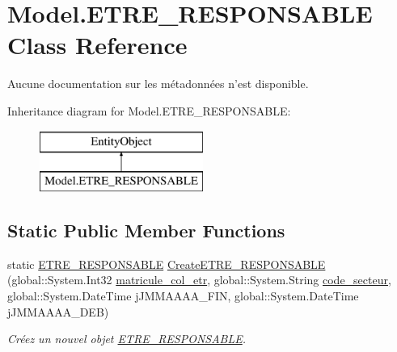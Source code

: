 \hypertarget{class_model_1_1_e_t_r_e___r_e_s_p_o_n_s_a_b_l_e}{\section{Model.\-E\-T\-R\-E\-\_\-\-R\-E\-S\-P\-O\-N\-S\-A\-B\-L\-E Class Reference}
\label{class_model_1_1_e_t_r_e___r_e_s_p_o_n_s_a_b_l_e}
}


Aucune documentation sur les métadonnées n'est disponible.  


Inheritance diagram for Model.\-E\-T\-R\-E\-\_\-\-R\-E\-S\-P\-O\-N\-S\-A\-B\-L\-E\-:\begin{figure}[H]
\begin{center}
\leavevmode
\includegraphics[height=2.000000cm]{class_model_1_1_e_t_r_e___r_e_s_p_o_n_s_a_b_l_e}
\end{center}
\end{figure}
\subsection*{Static Public Member Functions}
\begin{DoxyCompactItemize}
\item 
static \hyperlink{class_model_1_1_e_t_r_e___r_e_s_p_o_n_s_a_b_l_e}{E\-T\-R\-E\-\_\-\-R\-E\-S\-P\-O\-N\-S\-A\-B\-L\-E} \hyperlink{class_model_1_1_e_t_r_e___r_e_s_p_o_n_s_a_b_l_e_a4dc6c16664e77615ea058c1d1c212053}{Create\-E\-T\-R\-E\-\_\-\-R\-E\-S\-P\-O\-N\-S\-A\-B\-L\-E} (global\-::\-System.\-Int32 \hyperlink{class_model_1_1_e_t_r_e___r_e_s_p_o_n_s_a_b_l_e_a91950cf430a908f316fe4273dd78ab88}{matricule\-\_\-col\-\_\-etr}, global\-::\-System.\-String \hyperlink{class_model_1_1_e_t_r_e___r_e_s_p_o_n_s_a_b_l_e_a30b273a91b5e42411cf4022a07490c2e}{code\-\_\-secteur}, global\-::\-System.\-Date\-Time j\-J\-M\-M\-A\-A\-A\-A\-\_\-\-F\-I\-N, global\-::\-System.\-Date\-Time j\-J\-M\-M\-A\-A\-A\-A\-\_\-\-D\-E\-B)
\begin{DoxyCompactList}\small\item\em Créez un nouvel objet \hyperlink{class_model_1_1_e_t_r_e___r_e_s_p_o_n_s_a_b_l_e}{E\-T\-R\-E\-\_\-\-R\-E\-S\-P\-O\-N\-S\-A\-B\-L\-E}. \end{DoxyCompactList}\end{DoxyCompactItemize}
